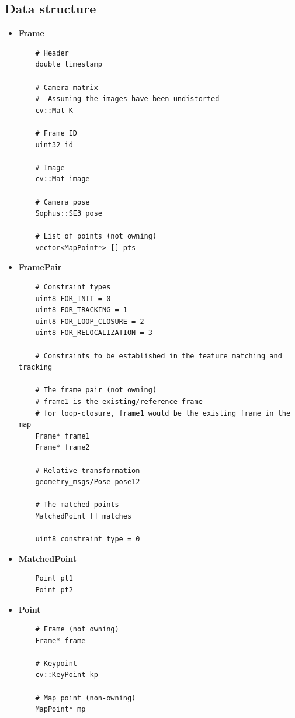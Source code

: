 \subsection{Data structure}

\begin{itemize}
  \item \textbf{Frame}
  \begin{verbatim}
    # Header
    double timestamp

    # Camera matrix
    #  Assuming the images have been undistorted
    cv::Mat K

    # Frame ID
    uint32 id 

    # Image
    cv::Mat image
    
    # Camera pose
    Sophus::SE3 pose
    
    # List of points (not owning)
    vector<MapPoint*> [] pts
  \end{verbatim}

  \item \textbf{FramePair}
  \begin{verbatim}
    # Constraint types
    uint8 FOR_INIT = 0
    uint8 FOR_TRACKING = 1
    uint8 FOR_LOOP_CLOSURE = 2
    uint8 FOR_RELOCALIZATION = 3

    # Constraints to be established in the feature matching and tracking 

    # The frame pair (not owning)
    # frame1 is the existing/reference frame
    # for loop-closure, frame1 would be the existing frame in the map
    Frame* frame1
    Frame* frame2

    # Relative transformation
    geometry_msgs/Pose pose12

    # The matched points
    MatchedPoint [] matches

    uint8 constraint_type = 0
  \end{verbatim}

  \item \textbf{MatchedPoint}
  \begin{verbatim}
    Point pt1    
    Point pt2
  \end{verbatim}

  \item \textbf{Point}
  \begin{verbatim}
    # Frame (not owning)
    Frame* frame
    
    # Keypoint
    cv::KeyPoint kp

    # Map point (non-owning)
    MapPoint* mp
    

\end{verbatim}
\end{itemize}
